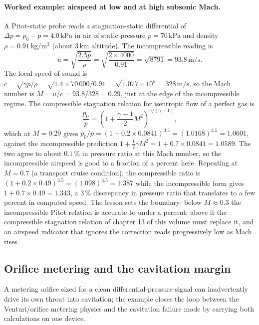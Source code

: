 \paragraph{Worked example: airspeed at low and at high subsonic
Mach.} A Pitot-static probe reads a stagnation-static differential of
$\Delta p = p_0 - p = 4.0\,\text{kPa}$ in air of static pressure $p =
70\,\text{kPa}$ and density $\rho = 0.91\,\si{\kilogram\per\meter
\cubed}$ (about $3\,\si{\kilo\meter}$ altitude). The incompressible
reading is
\[
u = \sqrt{\frac{2\Delta p}{\rho}} = \sqrt{\frac{2\times 4000}{0.91}}
= \sqrt{8791} = 93.8\,\si{\meter\per\second}.
\]
The local speed of sound is $c = \sqrt{\gamma p/\rho} = \sqrt{1.4
\times 70\,000/0.91} = \sqrt{1.077\times 10^5} =
328\,\si{\meter\per\second}$, so the Mach number is $M = u/c = 93.8/
328 = 0.29$, just at the edge of the incompressible regime. The
compressible stagnation relation for isentropic flow of a perfect gas
is
\[
\frac{p_0}{p} = \left(1 + \frac{\gamma - 1}{2}M^2\right)
^{\gamma/(\gamma - 1)},
\]
which at $M = 0.29$ gives $p_0/p = (1 + 0.2\times 0.0841)^{3.5} =
(1.0168)^{3.5} = 1.0601$, against the incompressible prediction
$1 + \tfrac12\gamma M^2 = 1 + 0.7\times 0.0841 = 1.0589$. The two
agree to about $0.1\,\%$ in pressure ratio at this Mach number, so
the incompressible airspeed is good to a fraction of a percent here.
Repeating at $M = 0.7$ (a transport cruise condition), the
compressible ratio is $(1 + 0.2\times 0.49)^{3.5} = (1.098)^{3.5} =
1.387$ while the incompressible form gives $1 + 0.7\times 0.49 =
1.343$, a $3\,\%$ discrepancy in pressure ratio that translates to a
few percent in computed speed. The lesson sets the boundary: below
$M \approx 0.3$ the incompressible Pitot relation is accurate to under
a percent; above it the compressible stagnation relation of
chapter 13 of this volume must replace it, and an airspeed indicator
that ignores the correction reads progressively low as Mach rises.

\subsection{Orifice metering and the cavitation margin}

A metering orifice sized for a clean differential-pressure signal can
inadvertently drive its own throat into cavitation; the example
closes the loop between the Venturi/orifice metering physics and the
cavitation failure mode by carrying both calculations on one device.



